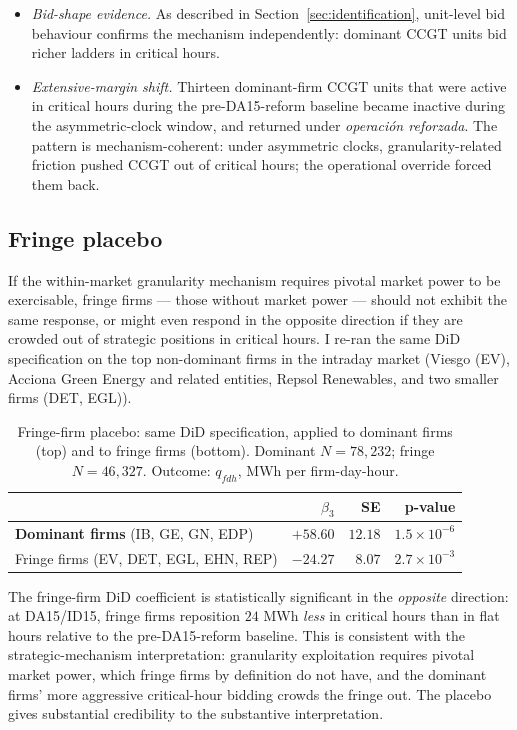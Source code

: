 \documentclass[11pt,a4paper]{article}
\begin{document}
\begin{itemize}
  \item \emph{Bid-shape evidence.} As described in Section~\ref{sec:identification}, unit-level bid behaviour confirms the mechanism independently: dominant CCGT units bid richer ladders in critical hours.
  \item \emph{Extensive-margin shift.} Thirteen dominant-firm CCGT units that were active in critical hours during the pre-DA15-reform baseline became inactive during the asymmetric-clock window, and returned under \emph{operación reforzada}. The pattern is mechanism-coherent: under asymmetric clocks, granularity-related friction pushed CCGT out of critical hours; the operational override forced them back.
\end{itemize}

\subsection{Fringe placebo}

If the within-market granularity mechanism requires pivotal market power to be exercisable, fringe firms --- those without market power --- should not exhibit the same response, or might even respond in the opposite direction if they are crowded out of strategic positions in critical hours. I re-ran the same DiD specification on the top non-dominant firms in the intraday market (Viesgo (EV), Acciona Green Energy and related entities, Repsol Renewables, and two smaller firms (DET, EGL)).

\begin{table}[h]
  \centering
  \begin{tabular}{lrrr}
    \toprule
                                                  & $\beta_3$           & SE      & p-value \\
    \midrule
    \textbf{Dominant firms} (IB, GE, GN, EDP)     & $\mathbf{+58.60}$   & $12.18$ & $1.5 \times 10^{-6}$ \\
    Fringe firms (EV, DET, EGL, EHN, REP)         & $-24.27$            & $8.07$  & $2.7 \times 10^{-3}$ \\
    \bottomrule
  \end{tabular}
  \caption{Fringe-firm placebo: same DiD specification, applied to dominant firms (top) and to fringe firms (bottom). Dominant $N = 78{,}232$; fringe $N = 46{,}327$. Outcome: $q_{fdh}$, MWh per firm-day-hour.}
  \label{tab:fringe}
\end{table}

The fringe-firm DiD coefficient is statistically significant in the \emph{opposite} direction: at DA15/ID15, fringe firms reposition $24$ MWh \emph{less} in critical hours than in flat hours relative to the pre-DA15-reform baseline. This is consistent with the strategic-mechanism interpretation: granularity exploitation requires pivotal market power, which fringe firms by definition do not have, and the dominant firms' more aggressive critical-hour bidding crowds the fringe out. The placebo gives substantial credibility to the substantive interpretation.
\end{document}
